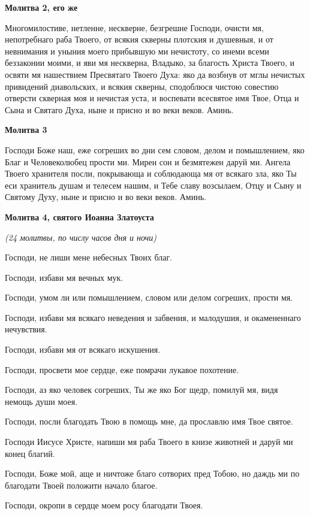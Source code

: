 \bfseries Молитва 2, его же\normalfont{}


Многомилостиве, нетленне, нескверне, безгрешне Господи, очисти мя, непотребнаго раба Твоего, от всякия скверны плотския и душевныя, и от невнимания и уныния моего прибывшую ми нечистоту, со инеми всеми беззаконии моими, и яви мя нескверна, Владыко, за благость Христа Твоего, и освяти мя нашествием Пресвятаго Твоего Духа: яко да возбнув от мглы нечистых привидений диавольских, и всякия скверны, сподоблюся чистою совестию отверсти скверная моя и нечистая уста, и воспевати всесвятое имя Твое, Отца и Сына и Святаго Духа, ныне и присно и во веки веков. Аминь.




\bfseries Молитва 3\normalfont{}


Господи Боже наш, еже согреших во дни сем словом, делом и помышлением, яко Благ и Человеколюбец прости ми. Мирен сон и безмятежен даруй ми. Ангела Твоего хранителя посли, покрывающа и соблюдающа мя от всякаго зла, яко Ты еси хранитель душам и телесем нашим, и Тебе славу возсылаем, Отцу и Сыну и Святому Духу, ныне и присно и во веки веков. Аминь.




\bfseries Молитва 4, святого Иоанна Златоуста\normalfont{}


\itshape (24 молитвы, по числу часов дня и ночи)\normalfont{}


Господи, не лиши мене небесных Твоих благ.


Господи, избави мя вечных мук.


Господи, умом ли или помышлением, словом или делом согреших, прости мя.


Господи, избави мя всякаго неведения и забвения, и малодушия, и окамененнаго нечувствия.


Господи, избави мя от всякаго искушения.


Господи, просвети мое сердце, еже помрачи лукавое похотение.


Господи, аз яко человек согреших, Ты же яко Бог щедр, помилуй мя, видя немощь души моея.


Господи, посли благодать Твою в помощь мне, да прославлю имя Твое святое.


Господи Иисусе Христе, напиши мя раба Твоего в книзе животней и даруй ми конец благий.


Господи, Боже мой, аще и ничтоже благо сотворих пред Тобою, но даждь ми по благодати Твоей положити начало благое.


Господи, окропи в сердце моем росу благодати Твоея.


